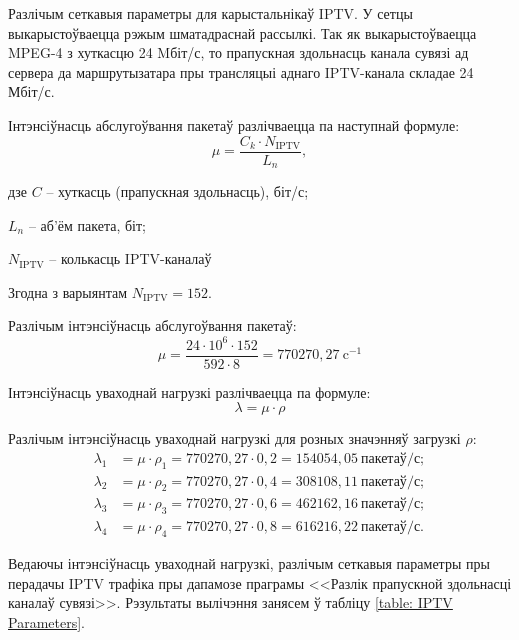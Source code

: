 \newpage

Разлічым сеткавыя параметры для карыстальнікаў IPTV.
У сетцы выкарыстоўваецца рэжым шматадраснай рассылкі.
Так як выкарыстоўваецца MPEG-4 з хуткасцю 24 Mбіт/с, то прапускная
здольнасць канала сувязі ад сервера да маршрутызатара пры
трансляцыі аднаго IPTV-канала складае 24 Мбіт/с.

Інтэнсіўнасць абслугоўвання пакетаў разлічваецца па наступнай формуле:
\begin{equation}
    \mu = \frac{C_k \cdot N_{\text{IPTV}}}{L_n},
\end{equation}
\begin{Explanation}
    \item[дзе] $C$ -- хуткасць (прапускная здольнасць), біт/с;
    \item $L_n$ -- аб'ём пакета, біт;
    \item $N_\text{IPTV}$ -- колькасць IPTV-каналаў
\end{Explanation}

Згодна з варыянтам $N_\text{IPTV} = 152$.

Разлічым інтэнсіўнасць абслугоўвання пакетаў:
\begin{equation*}
    \mu = \frac{24 \cdot 10^6 \cdot 152}{592 \cdot 8} = 770270{,}27\ \text{c}^{-1}
\end{equation*}

Інтэнсіўнасць уваходнай нагрузкі разлічваецца па формуле:
\begin{equation}
    \lambda = \mu \cdot \rho
\end{equation}

Разлічым інтэнсіўнасць уваходнай нагрузкі для розных значэнняў
загрузкі $\rho$:
\begin{align*}
    \lambda_1 &= \mu \cdot \rho_1 = 770270{,}27 \cdot 0{,}2 = 154054{,}05\ \text{пакетаў}/\text{с}; \\
    \lambda_2 &= \mu \cdot \rho_2 = 770270{,}27 \cdot 0{,}4 = 308108{,}11\ \text{пакетаў}/\text{с}; \\
    \lambda_3 &= \mu \cdot \rho_3 = 770270{,}27 \cdot 0{,}6 = 462162{,}16\ \text{пакетаў}/\text{с}; \\
    \lambda_4 &= \mu \cdot \rho_4 = 770270{,}27 \cdot 0{,}8 = 616216{,}22\ \text{пакетаў}/\text{с}.
\end{align*}

Ведаючы інтэнсіўнасць уваходнай нагрузкі, разлічым сеткавыя параметры
пры перадачы IPTV трафіка пры дапамозе праграмы
<<Разлік прапускной здольнасці каналаў сувязі>>.
Рэзультаты вылічэння занясем ў табліцу \ref{table: IPTV Parameters}.

